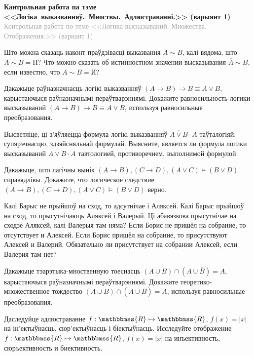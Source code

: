 


	
\begin{center}
	\textbf{Кантрольная работа па тэме <<Логіка~выказванняў.~Мноствы.~Адлюстраванні.>> (варыянт 1)} \\
	{\small \textcolor{darkgray}{Контрольная работа по теме <<Логика высказываний. Множества. Отображения.>> (вариант 1)}}
\end{center}

\begin{problemList}

\problemItemSimple
{Што можна сказаць наконт праўдзівасці выказвання $\overline{A} \sim B$, калі вядома, што $A \sim B = \mbox{П}$?}
{Что можно сказать об истинностном значении высказывания $\overline{A} \sim B$, если известно, что $A \sim B = \mbox{И}$?}

\problemItemSimple
{Дакажыце раўназначнасць логікі выказванняў $(A \to B) \to B \equiv A \vee B$, карыстаючыся раўназначнымі пераўтварэннямі.}
{Докажите равносильность логики высказываний $(A \to B) \to B \equiv A \vee B$, используя равносильные преобразования.}

\problemItemSimple
{Высветліце, ці з'яўляецца формула логікі выказванняў $\overline{A \vee B} \cdot A$ таўталогіяй, супярэчнасцю, здзяйсняльнай формулай.}
{Выясните, является ли формула логики высказываний $\overline{A \vee B} \cdot A$ тавтологией, противоречием, выполнимой формулой.}

\problemItemSimple
{Дакажыце, што лагічны вынік $(A \to B), (C \to D), (A \vee C) \models (B \vee D)$ справядлівы.}
{Докажите, что логическое следствие $(A \to B), (C \to D), (A \vee C) \models (B \vee D)$ верно.}

\problemItemSimple
{Калі Барыс не прыйшоў на сход, то адсутнічае і Аляксей. Калі Барыс прыйшоў на сход, то прысутнічаюць Аляксей і Валерый. Ці абавязкова прысутнічае на сходзе Аляксей, калі Валерыя там няма?}
{Если Борис не пришёл на собрание, то отсутствует и Алексей. Если Борис пришёл на собрание, то присутствуют Алексей и Валерий. Обязательно ли присутствует на собрании Алексей, если Валерия там нет?}

\problemItemSimple
{Дакажыце тэарэтыка-мноственную тоеснасць $(A \cup B) \cap (A \cup \overline{B}) = A$, карыстаючыся раўназначнымі пераўтварэннямі.}
{Докажите теоретико-множественное тождество $(A \cup B) \cap (A \cup \overline{B}) = A$, используя равносильные преобразования.}

\problemItemSimple
{Даследуйце адлюстраванне $f: \mathbbmss{R} \mapsto \mathbbmss{R}$, $f(x) = |x|$ на ін'ектыўнасць, сюр'ектыўнасць і біектыўнасць. }
{Исследуйте отображение $f: \mathbbmss{R} \mapsto \mathbbmss{R}$, $f(x) = |x|$ на инъективность, сюръективность и биективность.}


\end{problemList}
